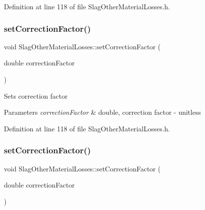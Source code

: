 Definition at line 118 of file Slag\+Other\+Material\+Losses.\+h.

\mbox{\label{class_slag_other_material_losses_a2aa985511888327bed6039da79c8958a}} 
\subsubsection{\texorpdfstring{set\+Correction\+Factor()}{setCorrectionFactor()}\hspace{0.1cm}{\footnotesize\ttfamily [2/3]}}
{\footnotesize\ttfamily void Slag\+Other\+Material\+Losses\+::set\+Correction\+Factor (\begin{DoxyParamCaption}\item[{double}]{correction\+Factor }\end{DoxyParamCaption})\hspace{0.3cm}{\ttfamily [inline]}}

Sets correction factor 
\begin{DoxyParams}{Parameters}
{\em correction\+Factor} & double, correction factor -\/ unitless \\
\hline
\end{DoxyParams}


Definition at line 118 of file Slag\+Other\+Material\+Losses.\+h.

\mbox{\label{class_slag_other_material_losses_a2aa985511888327bed6039da79c8958a}} 
\subsubsection{\texorpdfstring{set\+Correction\+Factor()}{setCorrectionFactor()}\hspace{0.1cm}{\footnotesize\ttfamily [3/3]}}
{\footnotesize\ttfamily void Slag\+Other\+Material\+Losses\+::set\+Correction\+Factor (\begin{DoxyParamCaption}\item[{double}]{correction\+Factor }\end{DoxyParamCaption})\hspace{0.3cm}{\ttfamily [inline]}}

